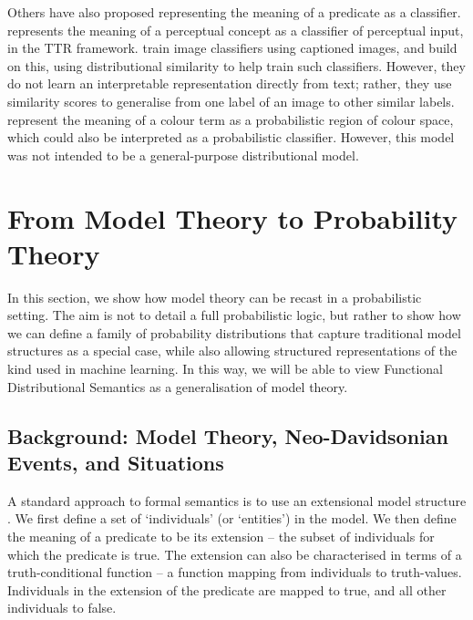 \documentclass[a4paper,11pt]{article}
\begin{document}
Others have also proposed representing the meaning of a predicate as a classifier.
\citet{larsson2013classifier} represents the meaning of a perceptual concept
as a classifier of perceptual input, in the TTR framework.
\citet{schlangen2016classifier} train image classifiers using captioned images,
and \citet{zarriess2017classifier,zarriess2017classifier2} build on this,
using distributional similarity to help train such classifiers.
However, they do not learn an interpretable representation directly from text;
rather, they use similarity scores
to generalise from one label of an image to other similar labels.
\citet{mcmahan2015colour} represent the meaning of a colour term
as a probabilistic region of colour space,
which could also be interpreted as a probabilistic classifier.
However, this model was not intended to be a general-purpose distributional model.


\pagebreak

\section{From Model Theory to Probability Theory}
\label{sec:model}

In this section, we show how model theory can be recast in a probabilistic setting.
The aim is not to detail a full probabilistic logic,
but rather to show how we can define a family of probability distributions
that capture traditional model structures as a special case,
while also allowing structured representations of the kind used in machine learning.
In this way, we will be able to view Functional Distributional Semantics
as a generalisation of model theory.

\vspace*{-1mm}
\subsection{Background: Model Theory, Neo-Davidsonian Events, and Situations}
\label{sec:back}

A standard approach to formal semantics
is to use an extensional model structure
\citep{cann1993sem, allan2001sem, kamp2013sem}.
We first define a set of `individuals' (or `entities') in the model.
We then define the meaning of a predicate to be its extension --
the subset of individuals for which the predicate is true.
The extension can also be characterised in terms of a truth-conditional function --
a function mapping from individuals to truth-values.
Individuals in the extension of the predicate are mapped to true,
and all other individuals to false.
\end{document}
